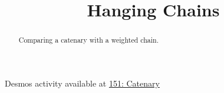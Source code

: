 \documentclass{ximera}
\title{Hanging Chains}
\begin{document}
\begin{abstract}
Comparing a catenary with a weighted chain.
\end{abstract}
\maketitle


\begin{question}  \label{Q:DFDFGGtg}

\begin{onlineOnly}
    \begin{center}
\end{center}
\end{onlineOnly}

Desmos activity available at \href{https://www.desmos.com/calculator/sv70z21j2j}{151: Catenary}

\end{question}
\end{document}
